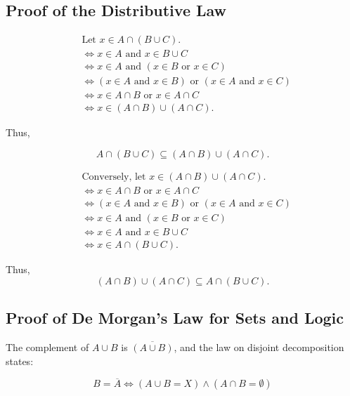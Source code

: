 \subsection{Proof of the Distributive Law}

\begin{align*}
	 & \text{Let } x \in A \cap (B \cup C).                                           \\
	 & \iff x \in A \text{ and } x \in B \cup C                                       \\
	 & \iff x \in A \text{ and } (x \in B \text{ or } x \in C)                        \\
	 & \iff (x \in A \text{ and } x \in B) \text{ or } (x \in A \text{ and } x \in C) \\
	 & \iff x \in A \cap B \text{ or } x \in A \cap C                                 \\
	 & \iff x \in (A \cap B) \cup (A \cap C).
\end{align*}

Thus,

\[
	A \cap (B \cup C) \subseteq (A \cap B) \cup (A \cap C).
\]

\begin{align*}
	 & \text{Conversely, let } x \in (A \cap B) \cup (A \cap C).                      \\
	 & \iff x \in A \cap B \text{ or } x \in A \cap C                                 \\
	 & \iff (x \in A \text{ and } x \in B) \text{ or } (x \in A \text{ and } x \in C) \\
	 & \iff x \in A \text{ and } (x \in B \text{ or } x \in C)                        \\
	 & \iff x \in A \text{ and } x \in B \cup C                                       \\
	 & \iff x \in A \cap (B \cup C).
\end{align*}

Thus,
\[
	(A \cap B) \cup (A \cap C) \subseteq A \cap (B \cup C).
\]

\QED

\subsection{Proof of De Morgan's Law for Sets and Logic}

The complement of \( A \cup B \) is \( \overline{(A \cup B)} \), and the law on disjoint decomposition
states:

\[
	B = \overline{A} \iff (A \cup B = X) \land (A \cap B = \emptyset)
\]

